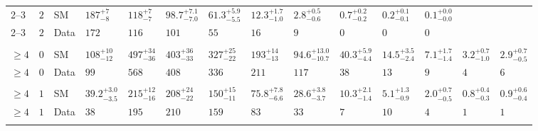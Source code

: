 \begin{landscape}
\begin{center}
\begin{table}[h!]
\begin{tabular}{ llllllllllllll }
    2--3                 & $2$      & SM   & $187^{+7}_{-8}$                & $118^{+7}_{-7}$                & $98.7^{+7.1}_{-7.0}$           & $61.3^{+5.9}_{-5.5}$           & $12.3^{+1.7}_{-1.0}$           & $2.8^{+0.5}_{-0.6}$            & $0.7^{+0.2}_{-0.2}$            & $0.2^{+0.1}_{-0.1}$            & $0.1^{+0.0}_{-0.0}$                      \\ 
    2--3                 & $2$      & Data & $172$                          & $116$                          & $101$                          & $55$                           & $16$                           & $9$                            & $0$                            & $0$                            & $0$                      \\ \\
    $\geq 4$             & $0$      & SM   & $108^{+10}_{-12}$              & $497^{+34}_{-36}$              & $403^{+36}_{-33}$              & $327^{+25}_{-22}$              & $193^{+14}_{-13}$              & $94.6^{+13.0}_{-10.7}$         & $40.3^{+5.9}_{-4.4}$           & $14.5^{+3.5}_{-2.4}$           & $7.1^{+1.7}_{-1.4}$            & $3.2^{+0.7}_{-1.0}$            & $2.9^{+0.7}_{-0.5}$ \\ 
    $\geq 4$             & $0$      & Data & $99$                           & $568$                          & $408$                          & $336$                          & $211$                          & $117$                          & $38$                           & $13$                           & $9$                            & $4$                            & $6$                 \\\\
    $\geq 4$             & $1$      & SM   & $39.2^{+3.0}_{-3.5}$           & $215^{+12}_{-16}$              & $208^{+24}_{-22}$              & $150^{+15}_{-11}$              & $75.8^{+7.8}_{-6.6}$           & $28.6^{+3.8}_{-3.7}$           & $10.3^{+2.1}_{-1.4}$           & $5.1^{+1.3}_{-0.9}$            & $2.0^{+0.7}_{-0.5}$            & $0.8^{+0.4}_{-0.3}$            & $0.9^{+0.6}_{-0.4}$ \\ 
    $\geq 4$             & $1$      & Data & $38$                           & $195$                          & $210$                          & $159$                          & $83$                           & $33$                           & $7$                            & $10$                           & $4$                            & $1$                            & $1$                 \\\\

\end{tabular}
\end{table}
\end{center}
\end{landscape}
